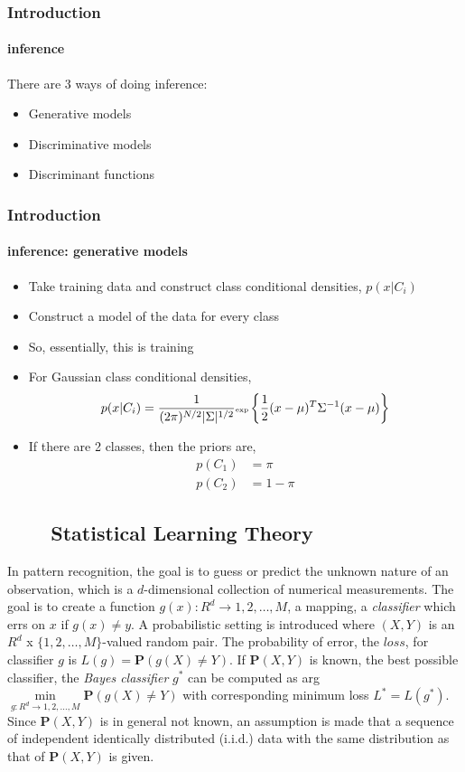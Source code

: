 \begin{frame}
\frametitle{Introduction}
\framesubtitle{inference}
\logoCSIPCPL\mypagenum
	There are 3 ways of doing inference:	
	\begin{itemize}
		\item Generative models
		\item Discriminative models
		\item Discriminant functions
	\end{itemize}
\end{frame}




\begin{frame}
\frametitle{Introduction}
\framesubtitle{inference: generative models}
\logoCSIPCPL\mypagenum
	\begin{itemize}
		\item Take training data and construct class conditional densities, $p(x|C_i)$
		\item Construct a model of the data for every class
		\item So, essentially, this is training
		\item For Gaussian class conditional densities,
			\begin{equation*}\tiny
			p(x|C_i) = \frac{1}{(2\pi)^{N/2}|\Sigma|^{1/2}}\text{exp}\left\{\frac{1}{2}(x-\mu)^T\Sigma^{-1}(x-\mu) \right\}
			\end{equation*}
		\item If there are 2 classes, then the priors are,
			\begin{align*}
				p(C_1)&=\pi   \\
				p(C_2)&=1-\pi 
			\end{align*}
	\end{itemize}
\end{frame}

\subsection{\ \ \ \ Statistical Learning Theory}

\begin{frame}[allowframebreaks]
In pattern recognition, the goal is to guess or predict the unknown nature of an observation, which is a $d$-dimensional collection of numerical measurements.  The goal is to create a function $g(x): R^d \rightarrow {1, 2, \ldots ,M}$, a mapping, a \emph{classifier} which errs on $x$ if $g(x) \neq y$.  A probabilistic setting is introduced where $(X,Y)$ is an $R^d$ x $\{1, 2, \ldots, M\}$-valued random pair.  The probability of error, the $loss$,  for classifier $g$ is $L(g) = \mathbf{P}(g(X) \neq Y)$.  If $\mathbf{P}(X,Y)$ is known,  the best possible classifier, the \emph{Bayes classifier} $g^*$ can be computed as arg $\min\limits_{g:R^d \rightarrow {1, 2, \ldots, M}} \mathbf{P}(g(X) \neq Y)$ with corresponding minimum loss $L^* = L(g^*)$.  Since $\mathbf{P}(X,Y)$ is in general not known, an assumption is made that a sequence of independent identically distributed (i.i.d.) data with the same distribution as that of $\mathbf{P}(X,Y)$ is given.
\end{frame}

